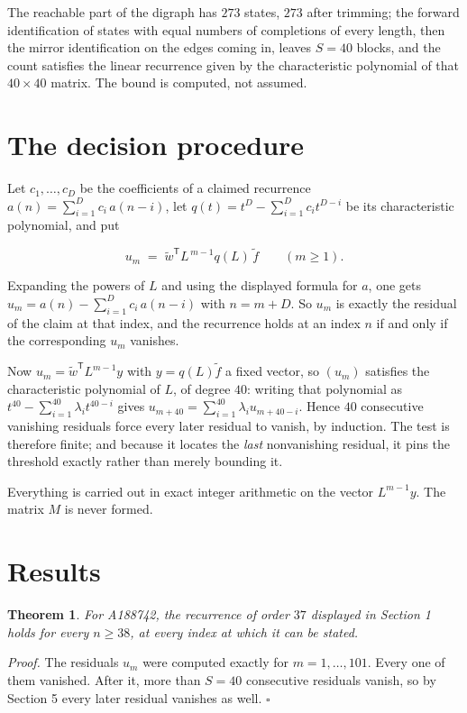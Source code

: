 \documentclass[11pt]{article}
\newtheorem{theorem}{Theorem}
\theoremstyle{definition}
\begin{document}
The reachable part of the digraph has $273$ states, $273$ after trimming; the forward identification of states with equal numbers of completions of every length, then the mirror identification on the edges coming in, leaves $S = 40$ blocks, and the count satisfies the linear recurrence given by the characteristic polynomial of that $40\times40$ matrix. The bound is computed, not assumed.

\section{The decision procedure}

Let $c_1,\dots,c_D$ be the coefficients of a claimed recurrence $a(n) = \sum_{i=1}^{D} c_i\,a(n-i)$, let $q(t) = t^{D} - \sum_{i=1}^{D} c_i t^{D-i}$ be its characteristic polynomial, and put

\[u_m \;=\; \tilde w^{\mathsf T} L^{\,m-1} q(L)\,\tilde f \qquad (m \ge 1).\]

Expanding the powers of $L$ and using the displayed formula for $a$, one gets $u_m = a(n) - \sum_{i=1}^{D} c_i\,a(n-i)$ with $n = m + D$. So $u_m$ is exactly the residual of the claim at that index, and the recurrence holds at an index $n$ if and only if the corresponding $u_m$ vanishes.

Now $u_m = \tilde w^{\mathsf T} L^{m-1} y$ with $y = q(L)\tilde f$ a fixed vector, so $(u_m)$ satisfies the characteristic polynomial of $L$, of degree $40$: writing that polynomial as $t^{40} - \sum_{i=1}^{40} \lambda_i t^{40-i}$ gives $u_{m+40} = \sum_{i=1}^{40} \lambda_i u_{m+40-i}$. Hence $40$ consecutive vanishing residuals force every later residual to vanish, by induction. The test is therefore finite; and because it locates the {\itshape last} nonvanishing residual, it pins the threshold exactly rather than merely bounding it.

Everything is carried out in exact integer arithmetic on the vector $L^{m-1}y$. The matrix $M$ is never formed.

\section{Results}

\begin{theorem} For A188742, the recurrence of order $37$ displayed in Section 1 holds for every $n \ge 38$, at every index at which it can be stated.\end{theorem}

{\itshape Proof.} The residuals $u_m$ were computed exactly for $m = 1,\dots,101$. Every one of them vanished. After it, more than $S = 40$ consecutive residuals vanish, so by Section 5 every later residual vanishes as well. $\square$
\end{document}
